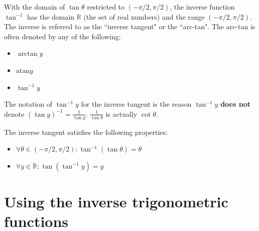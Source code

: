 \documentclass{article}
\begin{document}
With the domain of \(\tan\theta\) restricted to \((-\pi/2, \pi/2)\), the inverse function \(\tan^{-1}\) has the domain \(\mathbb{R}\) (the set of real numbers) and the range \((-\pi/2, \pi/2)\). The inverse is referred to as the ``inverse tangent" or the ``arc-tan". The arc-tan is often denoted by any of the following:

\begin{itemize}
\item \(\arctan y\)
\item \(\text{atan} y\)
\item \(\tan^{-1} y\) 
\end{itemize}

The notation of \(\tan^{-1} y\) for the inverse tangent is the reason \(\tan^{-1} y\) {\bf does not} denote \((\tan y)^{-1} = \frac{1}{\tan y}\). \(\frac{1}{\tan\theta}\) is actually \(\cot\theta\).

The inverse tangent satisfies the following properties:
\begin{itemize}
\item \(\forall \theta \in (-\pi/2, \pi/2) : \tan^{-1}(\tan\theta) = \theta\)
\item \(\forall y \in \mathbb{R} : \tan(\tan^{-1}y) = y\)
\end{itemize}





\section{Using the inverse trigonometric functions}
\end{document}
